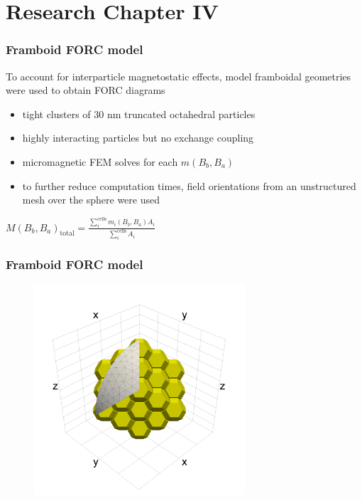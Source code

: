 \documentclass{beamer}
\begin{document}
        \section{Research Chapter IV}
        \begin{frame}
          \frametitle{Framboid FORC model}
          To account for interparticle magnetostatic effects, model framboidal geometries were used to obtain FORC diagrams
          \begin{itemize}
            \item tight clusters of 30 nm truncated octahedral particles
            \item highly interacting particles but no exchange coupling
            \item micromagnetic FEM solves for each $m(B_b, B_a)$
            \item to further reduce computation times, field orientations from an unstructured mesh over the sphere were used
          \end{itemize}
          \vspace{2mm} \center \Large $\textit{M}(\textit{B}_{\textit{b}}, \textit{B}_{\textit{a}})_{\text{total}} = \frac{\sum_{\textit{i}}^{\text{cells}}\textit{m}_{\textit{i}}(\textit{B}_{\textit{b}}, \textit{B}_{\textit{a}}) \textit{A}_{\textit{i}}}{\sum_{\textit{i}}^{\text{cells}}\textit{A}_{\textit{i}}}$
        \end{frame}

        \begin{frame}
          \frametitle{Framboid FORC model}
          \begin{figure}[htb]
            \centering
            \includegraphics[width=0.7\textwidth]{Chapter_04_Figure_01.pdf}
          \end{figure}
        \end{frame}
\end{document}
